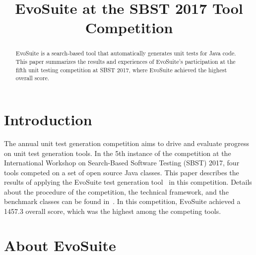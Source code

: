 \documentclass[10pt,conference]{IEEEtran}
\newcommand{\EVOSUITE}{{\sc EvoSuite}\xspace}
\begin{document}
% 

\title{EvoSuite at the SBST 2017 Tool Competition}
 

\author{}


\maketitle

\begin{abstract}
  \EVOSUITE is a search-based tool that automatically generates unit
  tests for Java code.  This paper summarizes the results and
  experiences of \EVOSUITE's participation at the fifth unit testing
  competition at SBST 2017, where \EVOSUITE achieved the highest
  overall score.
\end{abstract}



\section{Introduction}
The annual unit test generation competition aims to drive and evaluate
progress on unit test generation tools. In the 5th instance of the
competition at the International Workshop on Search-Based Software
Testing (SBST) 2017, four tools competed on a set of open source Java
classes. This paper describes the results of applying the \EVOSUITE
test generation tool~\cite{FrA11c} in this competition. Details about
the procedure of the competition, the technical framework, and the
benchmark classes can be found in~\cite{sbst17competition}.  In this
competition, \EVOSUITE achieved a 1457.3 overall score, which was the
highest among the competing tools.

\section{About EvoSuite}
\end{document}
